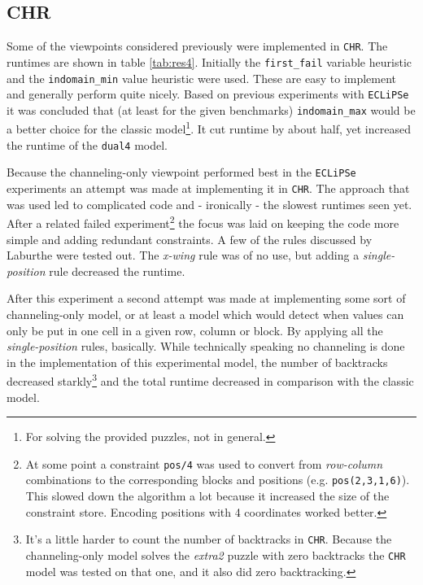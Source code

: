 \subsection{CHR}

Some of the viewpoints considered previously were implemented in \texttt{CHR}. The runtimes are shown in table \ref{tab:res4}. Initially the \texttt{first\_fail} variable heuristic and the \texttt{indomain\_min} value heuristic were used. These are easy to implement and generally perform quite nicely. Based on previous experiments with \texttt{ECLiPSe} it was concluded that (at least for the given benchmarks) \texttt{indomain\_max} would be a better choice for the classic model\footnote{For solving the provided puzzles, not in general.}. It cut runtime by about half, yet increased the runtime of the \texttt{dual4} model.\\\par 

Because the channeling-only viewpoint performed best in the \texttt{ECLiPSe} experiments an attempt was made at implementing it in \texttt{CHR}. The approach that was used led to complicated code and - ironically - the slowest runtimes seen yet. After a related failed experiment\footnote{At some point a constraint \texttt{pos/4} was used to convert from \textit{row-column} combinations to the corresponding blocks and positions (e.g. \texttt{pos(2,3,1,6)}). This slowed down the algorithm a lot because it increased the size of the constraint store. Encoding positions with 4 coordinates worked better.} the focus was laid on keeping the code more simple and adding redundant constraints. A few of the rules discussed by Laburthe \cite{article:laburthe} were tested out. The \textit{x-wing} rule was of no use, but adding a \textit{single-position} rule decreased the runtime. \\\par

After this experiment a second attempt was made at implementing some sort of channeling-only model, or at least a model which would detect when values can only be put in one cell in a given row, column or block. By applying all the \textit{single-position} rules, basically. While technically speaking no channeling is done in the implementation of this experimental model, the number of backtracks decreased starkly\footnote{It's a little harder to count the number of backtracks in \texttt{CHR}. Because the channeling-only model solves the \textit{extra2} puzzle with zero backtracks the \texttt{CHR} model was tested on that one, and it also did zero backtracking.} and the total runtime decreased in comparison with the classic model.\\\par

